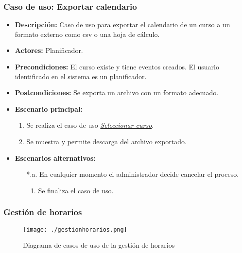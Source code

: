 \subsubsection*{Caso de uso: Exportar calendario}
\begin{itemize}
\item{\bf Descripción:} Caso de uso para exportar el calendario de un curso a un formato externo como csv o una hoja de cálculo.
\item{\bf Actores:} Planificador.
\item{\bf Precondiciones:} El curso existe y tiene eventos creados. El usuario identificado en el sistema es un planificador.
\item{\bf Postcondiciones:} Se exporta un archivo con un formato adecuado.
\item{\bf Escenario principal:}
	\begin{enumerate}
	\item Se realiza el caso de uso {\em \hyperref[select_curso]{Seleccionar curso}}.
	\item Se muestra y permite descarga del archivo exportado.
	\end{enumerate}
\item{\bf Escenarios alternativos:}
	\begin{itemize}
		\item[*.a.] En cualquier momento el administrador decide cancelar el proceso.
		\begin{enumerate}
			\item Se finaliza el caso de uso.
		\end{enumerate}
	\end{itemize}
\end{itemize}


\subsubsection{Gestión de horarios}
\begin{figure}[H] 
  \label{gestion-horarios} 
	\begin{center}
    \texttt{[image: ./gestionhorarios.png]}
  \end{center}
\caption{Diagrama de casos de uso de la gestión de horarios}
\end{figure}

